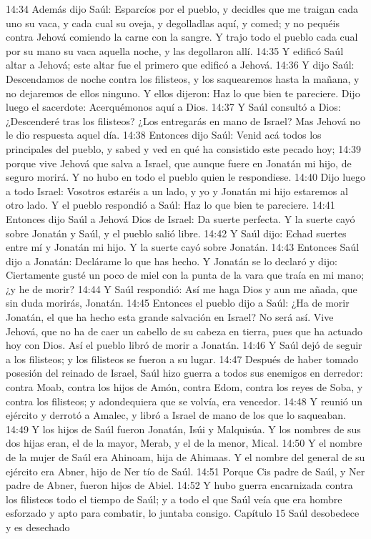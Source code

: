 14:34 Además dijo Saúl: Esparcíos por el pueblo, y decidles que me traigan cada uno su vaca, y cada cual su oveja, y degolladlas aquí, y comed; y no pequéis contra Jehová comiendo la carne con la sangre. Y trajo todo el pueblo cada cual por su mano su vaca aquella noche, y las degollaron allí.  
14:35 Y edificó Saúl altar a Jehová; este altar fue el primero que edificó a Jehová.  
14:36 Y dijo Saúl: Descendamos de noche contra los filisteos, y los saquearemos hasta la mañana, y no dejaremos de ellos ninguno. Y ellos dijeron: Haz lo que bien te pareciere. Dijo luego el sacerdote: Acerquémonos aquí a Dios.  
14:37 Y Saúl consultó a Dios: ¿Descenderé tras los filisteos? ¿Los entregarás en mano de Israel? Mas Jehová no le dio respuesta aquel día.  
14:38 Entonces dijo Saúl: Venid acá todos los principales del pueblo, y sabed y ved en qué ha consistido este pecado hoy;  
14:39 porque vive Jehová que salva a Israel, que aunque fuere en Jonatán mi hijo, de seguro morirá. Y no hubo en todo el pueblo quien le respondiese.  
14:40 Dijo luego a todo Israel: Vosotros estaréis a un lado, y yo y Jonatán mi hijo estaremos al otro lado. Y el pueblo respondió a Saúl: Haz lo que bien te pareciere.  
14:41 Entonces dijo Saúl a Jehová Dios de Israel: Da suerte perfecta. Y la suerte cayó sobre Jonatán y Saúl, y el pueblo salió libre.  
14:42 Y Saúl dijo: Echad suertes entre mí y Jonatán mi hijo. Y la suerte cayó sobre Jonatán.  
14:43 Entonces Saúl dijo a Jonatán: Declárame lo que has hecho. Y Jonatán se lo declaró y dijo: Ciertamente gusté un poco de miel con la punta de la vara que traía en mi mano; ¿y he de morir?  
14:44 Y Saúl respondió: Así me haga Dios y aun me añada, que sin duda morirás, Jonatán.  
14:45 Entonces el pueblo dijo a Saúl: ¿Ha de morir Jonatán, el que ha hecho esta grande salvación en Israel? No será así. Vive Jehová, que no ha de caer un cabello de su cabeza en tierra, pues que ha actuado hoy con Dios. Así el pueblo libró de morir a Jonatán.  
14:46 Y Saúl dejó de seguir a los filisteos; y los filisteos se fueron a su lugar.  
14:47 Después de haber tomado posesión del reinado de Israel, Saúl hizo guerra a todos sus enemigos en derredor: contra Moab, contra los hijos de Amón, contra Edom, contra los reyes de Soba, y contra los filisteos; y adondequiera que se volvía, era vencedor.  
14:48 Y reunió un ejército y derrotó a Amalec, y libró a Israel de mano de los que lo saqueaban.  
14:49 Y los hijos de Saúl fueron Jonatán, Isúi y Malquisúa. Y los nombres de sus dos hijas eran, el de la mayor, Merab, y el de la menor, Mical.  
14:50 Y el nombre de la mujer de Saúl era Ahinoam, hija de Ahimaas. Y el nombre del general de su ejército era Abner, hijo de Ner tío de Saúl.  
14:51 Porque Cis padre de Saúl, y Ner padre de Abner, fueron hijos de Abiel.  
14:52 Y hubo guerra encarnizada contra los filisteos todo el tiempo de Saúl; y a todo el que Saúl veía que era hombre esforzado y apto para combatir, lo juntaba consigo.  
Capítulo 15 
Saúl desobedece y es desechado  

